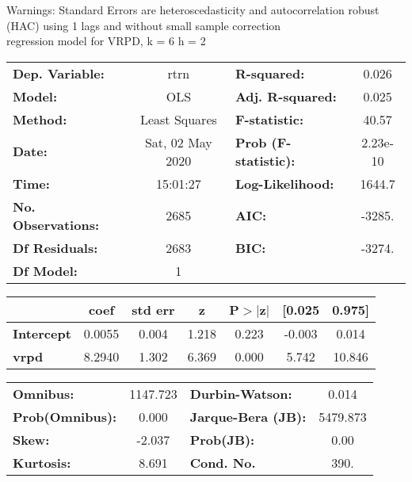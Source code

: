 Warnings: \newline
 [1] Standard Errors are heteroscedasticity and autocorrelation robust (HAC) using 1 lags and without small sample correction\\ 

regression model for VRPD, k = 6 h = 2\begin{center}
\begin{tabular}{lclc}
\toprule
\textbf{Dep. Variable:}    &       rtrn       & \textbf{  R-squared:         } &     0.026   \\
\textbf{Model:}            &       OLS        & \textbf{  Adj. R-squared:    } &     0.025   \\
\textbf{Method:}           &  Least Squares   & \textbf{  F-statistic:       } &     40.57   \\
\textbf{Date:}             & Sat, 02 May 2020 & \textbf{  Prob (F-statistic):} &  2.23e-10   \\
\textbf{Time:}             &     15:01:27     & \textbf{  Log-Likelihood:    } &    1644.7   \\
\textbf{No. Observations:} &        2685      & \textbf{  AIC:               } &    -3285.   \\
\textbf{Df Residuals:}     &        2683      & \textbf{  BIC:               } &    -3274.   \\
\textbf{Df Model:}         &           1      & \textbf{                     } &             \\
\bottomrule
\end{tabular}
\begin{tabular}{lcccccc}
                   & \textbf{coef} & \textbf{std err} & \textbf{z} & \textbf{P$> |$z$|$} & \textbf{[0.025} & \textbf{0.975]}  \\
\midrule
\textbf{Intercept} &       0.0055  &        0.004     &     1.218  &         0.223        &       -0.003    &        0.014     \\
\textbf{vrpd}      &       8.2940  &        1.302     &     6.369  &         0.000        &        5.742    &       10.846     \\
\bottomrule
\end{tabular}
\begin{tabular}{lclc}
\textbf{Omnibus:}       & 1147.723 & \textbf{  Durbin-Watson:     } &    0.014  \\
\textbf{Prob(Omnibus):} &   0.000  & \textbf{  Jarque-Bera (JB):  } & 5479.873  \\
\textbf{Skew:}          &  -2.037  & \textbf{  Prob(JB):          } &     0.00  \\
\textbf{Kurtosis:}      &   8.691  & \textbf{  Cond. No.          } &     390.  \\
\bottomrule
\end{tabular}
\end{center}

